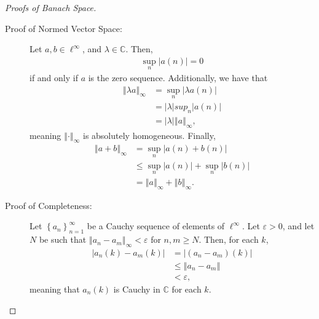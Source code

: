 \documentclass[12pt]{extarticle}
\newcommand{\C}{\mathbb{C}}
\newcommand{\norm}[1]{\left\Vert #1\right\Vert}
\newcommand{\set}[1]{\left\{#1\right\}}
\newcommand{\ve}{\varepsilon}
\theoremstyle{plain}
\theoremstyle{definition}
\theoremstyle{note}
\renewcommand{\newline}{\hfill\break}
\begin{document}
\begin{proof}[Proofs of Banach Space]\hfill
  \begin{description}[font = \normalfont]
    \item[$\ell^{\infty}$:]\hfill
      \begin{description}
        \item[Proof of Normed Vector Space:] Let $a,b\in \ell^{\infty}$, and $\lambda \in \C$. Then,
          \begin{align*}
            \sup_{n}|a(n)| = 0
          \end{align*}
          if and only if $a$ is the zero sequence. Additionally, we have that
          \begin{align*}
            \norm{\lambda a}_{\infty} &= \sup_{n}\left\vert \lambda a(n) \right\vert\\
                             &= |\lambda|sup_{n}|a(n)|\\
                             &= |\lambda|\norm{a}_{\infty},
          \end{align*}
          meaning $\norm{\cdot}_{\infty}$ is absolutely homogeneous. Finally,
          \begin{align*}
            \norm{a + b}_{\infty} &= \sup_{n}\left\vert a(n) + b(n) \right\vert\\
                         &\leq \sup_{n}\left\vert a(n) \right\vert + \sup_{n}\left\vert b(n) \right\vert\\
                         &= \norm{a}_{\infty} + \norm{b}_{\infty}.
          \end{align*}
        \item[Proof of Completeness:] Let $\set{a_n}_{n=1}^{\infty}$ be a Cauchy sequence of elements of $\ell^{\infty}$. Let $\ve > 0$, and let $N$ be such that $\norm{a_n - a_m}_{\infty} < \varepsilon$ for $n,m \geq N$. Then, for each $k$,
          \begin{align*}
            \left\vert a_{n}(k) - a_m(k) \right\vert &= \left\vert (a_n - a_m)(k) \right\vert\\
                                                     &\leq \norm{a_n - a_m}\\
                                                     &< \varepsilon,
          \end{align*}
          meaning that $a_n(k)$ is Cauchy in $\C$ for each $k$.\newline


\end{description}
\end{description}
\end{proof}
\end{document}
